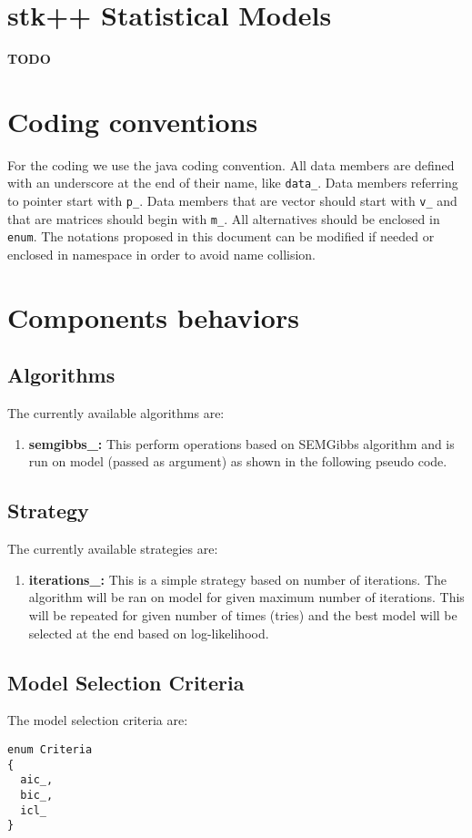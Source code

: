 \documentclass[a4paper,11pt]{article}
\begin{document}
\label{datahandling}
\section{stk++ Statistical Models}

{\bf TODO}

\appendix

\section{Coding conventions}

For the coding we use the java coding convention. All data members
are defined with an underscore at the end of their name, like \verb+data_+.
Data members referring to pointer start with \verb+p_+.
Data members that are vector should start with \verb+v_+ and that are matrices should begin with \verb+m_+.
All alternatives should be enclosed in \verb+enum+.
The notations proposed in this document can be modified if needed
or enclosed in namespace in order to avoid name collision.


\section{Components behaviors}
\subsection{Algorithms}

The currently available algorithms are:

\begin{enumerate}
 \item {\bf semgibbs\_:} This perform operations based on SEMGibbs algorithm and is run on model (passed as argument) as shown in the following pseudo code.
\end{enumerate}

\subsection{Strategy}

The currently available strategies are:
\begin{enumerate}
 \item {\bf iterations\_:} This is a simple strategy based on number of iterations. The algorithm will be ran on model for given maximum number of iterations. This will be repeated for given number of times (tries) and the best model will be selected at the end based on log-likelihood.
\end{enumerate}

\subsection{Model Selection Criteria}
The model selection criteria are:
\begin{verbatim}
enum Criteria
{
  aic_,
  bic_,
  icl_
}
\end{verbatim}
\end{document}
